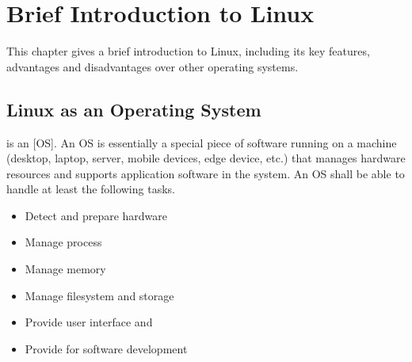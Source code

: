 \chapter{Brief Introduction to Linux}

This chapter gives a brief introduction to Linux, including its key features, advantages and disadvantages over other operating systems.

\section{Linux as an Operating System}
 is an [OS]. An OS is essentially a special piece of software running on a machine (desktop, laptop, server, mobile devices, edge device, etc.) that manages hardware resources and supports application software in the system. An OS shall be able to handle at least the following tasks.
\begin{itemize}
  \item Detect and prepare hardware
  \item Manage process
  \item Manage memory
  \item Manage filesystem and storage
  \item Provide user interface and 
  \item Provide  for software development
\end{itemize}

